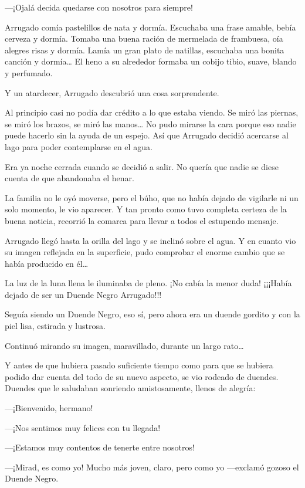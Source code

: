 \documentclass{barcodevapor3pags}
\begin{document}
---¡Ojalá decida quedarse con nosotros para siempre!

Arrugado comía pastelillos de nata y dormía. Escuchaba una frase amable,
bebía cerveza y dormía. Tomaba una buena ración de mermelada de
frambuesa, oía alegres risas y dormía. Lamía un gran plato de natillas,
escuchaba una bonita canción y dormía\ldots{} El heno a su alrededor
formaba un cobijo tibio, suave, blando y perfumado.

Y un atardecer, Arrugado descubrió una cosa sorprendente.

Al principio casi no podía dar crédito a lo que estaba viendo. Se miró
las piernas, se miró los brazos, se miró las manos\ldots{} No pudo
mirarse la cara porque eso nadie puede hacerlo sin la ayuda de un
espejo. Así que Arrugado decidió acercarse al lago para poder
contemplarse en el agua.

Era ya noche cerrada cuando se decidió a salir. No quería que nadie se
diese cuenta de que abandonaba el henar.

La familia no le oyó moverse, pero el búho, que no había dejado de
vigilarle ni un solo momento, le vio aparecer. Y tan pronto como tuvo
completa certeza de la buena noticia, recorrió la comarca para llevar a
todos el estupendo mensaje.

Arrugado llegó hasta la orilla del lago y se inclinó sobre el agua. Y en
cuanto vio su imagen reflejada en la superficie, pudo comprobar el
enorme cambio que se había producido en él\ldots{}

La luz de la luna llena le iluminaba de pleno. ¡No cabía la menor duda!
¡¡¡Había dejado de ser un Duende Negro Arrugado!!!

Seguía siendo un Duende Negro, eso sí, pero ahora era un duende gordito
y con la piel lisa, estirada y lustrosa.

Continuó mirando su imagen, maravillado, durante un largo rato\ldots{}


Y antes de que hubiera pasado suficiente tiempo como para que se hubiera
podido dar cuenta del todo de su nuevo aspecto, se vio rodeado de
duendes. Duendes que le saludaban sonriendo amistosamente, llenos de
alegría:

---¡Bienvenido, hermano!

---¡Nos sentimos muy felices con tu llegada!

---¡Estamos muy contentos de tenerte entre nosotros!

---¡Mirad, es como yo! Mucho más joven, claro, pero como yo ---exclamó
gozoso el Duende Negro.
\end{document}
